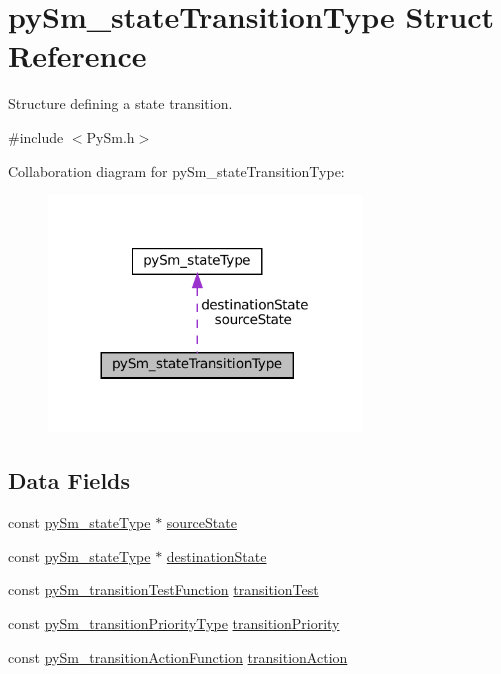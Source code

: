 \hypertarget{structpySm__stateTransitionType}{}\section{py\+Sm\+\_\+state\+Transition\+Type Struct Reference}
\label{structpySm__stateTransitionType}


Structure defining a state transition.  




{\ttfamily \#include $<$Py\+Sm.\+h$>$}



Collaboration diagram for py\+Sm\+\_\+state\+Transition\+Type\+:\nopagebreak
\begin{figure}[H]
\begin{center}
\leavevmode
\includegraphics[width=236pt]{structpySm__stateTransitionType__coll__graph}
\end{center}
\end{figure}
\subsection*{Data Fields}
\begin{DoxyCompactItemize}
\item 
const \hyperlink{structpySm__stateType}{py\+Sm\+\_\+state\+Type} $\ast$ \hyperlink{structpySm__stateTransitionType_adb9a41fd9d60f064fabaa74ef2698bd7}{source\+State}
\item 
const \hyperlink{structpySm__stateType}{py\+Sm\+\_\+state\+Type} $\ast$ \hyperlink{structpySm__stateTransitionType_aeff05523d3e91571e745460314e46116}{destination\+State}
\item 
const \hyperlink{PySm_8h_aeedbab67e9dba20efba287fbe3515e43}{py\+Sm\+\_\+transition\+Test\+Function} \hyperlink{structpySm__stateTransitionType_ab3a3cb53af27cfedcc63edb36d5f7639}{transition\+Test}
\item 
const \hyperlink{PySm_8h_ae3950be0321f85684919c1c5e0c3fba1}{py\+Sm\+\_\+transition\+Priority\+Type} \hyperlink{structpySm__stateTransitionType_a0c95a5a437e65155d1100d3016f9575f}{transition\+Priority}
\item 
const \hyperlink{PySm_8h_ac67ca0ce02947dc3f915629091327717}{py\+Sm\+\_\+transition\+Action\+Function} \hyperlink{structpySm__stateTransitionType_a02fc12242851c7d129808a4e81cf1b78}{transition\+Action}
\end{DoxyCompactItemize}


